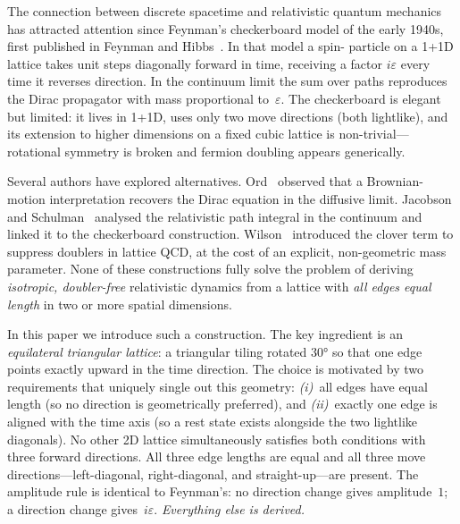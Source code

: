 \documentclass[twocolumn,showpacs,preprintnumbers,amsmath,amssymb]{revtex4-2}
\newcommand{\eps}{\varepsilon}
\begin{document}
The connection between discrete spacetime and relativistic quantum mechanics
has attracted attention since Feynman's checkerboard model of the early 1940s,
first published in Feynman and Hibbs~\cite{feynman1965}.
In that model a spin- particle on a \mbox{1\!+\!1D} lattice
takes unit steps diagonally forward in time, receiving a factor $i\eps$ every
time it reverses direction.
In the continuum limit the sum over paths reproduces the Dirac propagator with
mass proportional to~$\eps$.
The checkerboard is elegant but limited: it lives in \mbox{1\!+\!1D}, uses
only two move directions (both lightlike), and its extension to higher
dimensions on a fixed cubic lattice is non-trivial---rotational symmetry is
broken and fermion doubling
\cite{nielsen1981,susskind1977} appears generically.

Several authors have explored alternatives.
Ord~\cite{ord1983} observed that a Brownian-motion interpretation recovers the
Dirac equation in the diffusive limit.
Jacobson and Schulman~\cite{jacobson1984} analysed the relativistic path
integral in the continuum and linked it to the checkerboard construction.
Wilson~\cite{wilson1974} introduced the clover term to suppress doublers in
lattice QCD, at the cost of an explicit, non-geometric mass parameter.
None of these constructions fully solve the problem of deriving
\emph{isotropic, doubler-free} relativistic dynamics from a lattice with
\emph{all edges equal length} in two or more spatial dimensions.

In this paper we introduce such a construction.
The key ingredient is an \emph{equilateral triangular lattice}: a triangular
tiling rotated $30°$ so that one edge points exactly upward in the time
direction.
The choice is motivated by two requirements that uniquely single out this
geometry: \emph{(i)}~all edges have equal length (so no direction is
geometrically preferred), and \emph{(ii)}~exactly one edge is aligned with
the time axis (so a rest state exists alongside the two lightlike diagonals).
No other 2D lattice simultaneously satisfies both conditions with three forward
directions.
All three edge lengths are equal and all three move directions---left-diagonal,
right-diagonal, and straight-up---are present.
The amplitude rule is identical to Feynman's: no direction change gives
amplitude~$1$; a direction change gives~$i\eps$.
\emph{Everything else is derived.}
\end{document}
